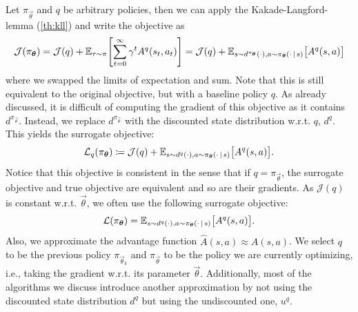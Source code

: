 		Let \(\pi_{\vec{\theta}}\) and \(q\) be arbitrary policies, then we can apply the Kakade-Langford-lemma (\autoref{th:kll}) and write the objective as
		\begin{equation}
			\mathcal{J}(\pi_{\bm{\theta}})
				= \mathcal{J}(q) + \mathbb{E}_{\tau \sim \pi}\Biggl[ \sum_{t = 0}^{\infty} \gamma^t A^q(s_t, a_t) \Biggr]
				= \mathcal{J}(q) + \mathbb{E}_{s \sim d^{\pi_{\bm{\theta}}}(\cdot), a \sim \pi_{\bm{\theta}}(\cdot \,\vert\, s)}\bigl[ A^q(s, a) \bigr]
		\end{equation}
		where we swapped the limits of expectation and sum. Note that this is still equivalent to the original objective, but with a baseline policy \(q\). As already discussed, it is difficult of computing the gradient of this objective as it contains \(d^{\pi_{\vec{\theta}}}\). Instead, we replace \(d^{\pi_{\vec{\theta}}}\) with the discounted state distribution w.r.t. \(q\), \(d^q\). This yields the surrogate objective:
		\begin{equation}
			\mathcal{L}_q(\pi_{\bm{\theta}}) \coloneqq \mathcal{J}(q) + \mathbb{E}_{s \sim d^q(\cdot), a \sim \pi_{\bm{\theta}}(\cdot \,\vert\, s)}\bigl[ A^q(s, a) \bigr].
		\end{equation}
		Notice that this objective is consistent in the sense that if \(q = \pi_{\vec{\theta}}\), the surrogate objective and true objective are equivalent and so are their gradients. As \(\mathcal{J}(q)\) is constant w.r.t. \(\vec{\theta}\), we often use the following surrogate objective:
		\begin{equation}
			\mathcal{L}(\pi_{\bm{\theta}}) = \mathbb{E}_{s \sim d^q(\cdot), a \sim \pi_{\bm{\theta}}(\cdot \,\vert\, s)}\bigl[ A^q(s, a) \bigr].
		\end{equation}
		Also, we approximate the advantage function \( \hat{A}(s, a) \approx A(s, a) \). We select \(q\) to be the previous policy \(\pi_{\vec{\theta}_k}\) and \(\pi_{\vec{\theta}}\) to be the policy we are currently optimizing, i.e., taking the gradient w.r.t. its parameter \(\vec{\theta}\). Additionally, most of the algorithms we discuss introduce another approximation by not using the discounted state distribution \(d^q\) but using the undiscounted one, \(u^q\).

